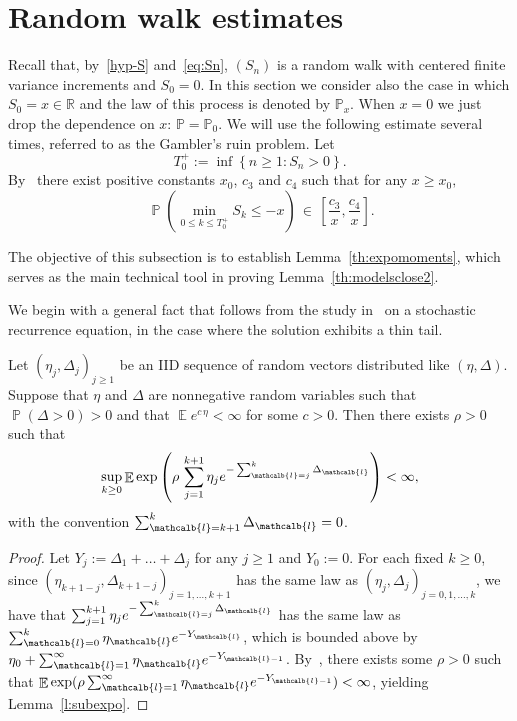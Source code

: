 \documentclass[AHL,Unicode,longabstracts,published]{cedram}
\newcommand{\bbP}{\mathbb{P}}
\newcommand{\bbR}{\mathbb{R}}
\newcommand{\gD}{\Delta}
\DeclareMathOperator{\p}{\mathbb{P}}
\DeclareMathOperator{\e}{\mathbb{E}}
\renewcommand{\ell}{\mathcalb{l}}
\begin{document}
\section{Random walk estimates}
\label{sec:A}
Recall that, by~\eqref{hyp-S} and~\eqref{eq:Sn}, $(S_n)$ is a random walk with centered finite variance increments and $S_0=0$. In this section we consider also the case in which $S_0=x\in \bbR$ and the law of this process is denoted by $\bbP_x$. When $x=0$ we just drop the dependence on $x$: $\bbP=\bbP_0$. We will use the following estimate several times, referred to as the Gambler's ruin problem. Let
\begin{equation}
T^+_0:= \inf\left\{n\ge 1: S_n >0\right\}.
\end{equation}
By~\cite[Theorem~5.1.7]{cf:LaLi} there exist positive constants $x_0$, $c_3$ and $c_4$ such that for any $x\ge x_0, $
\begin{equation}
\,\p\left(\min_{0\le k\le T^+_0}S_k \le -x \right) \,\in\, \left[\frac{c_3}x, \frac{c_4}x\right].\label{exitproba1}
\end{equation}


The objective of this subsection is to establish Lemma~\ref{th:expomoments}, which serves as the main technical tool in proving Lemma~\ref{th:modelsclose2}.



We begin with a general fact that follows from the study in~\cite{Goldie-Grubel} on a stochastic recurrence equation, in the case where the solution exhibits a thin tail.

\begin{lemm}\label{l:subexpo}
Let $(\eta_j, \Delta_j)_{j\ge 1}$ be an IID sequence of random vectors distributed like $(\eta, \Delta)$. Suppose that $\eta$ and $\Delta$ are nonnegative random variables such that $\p(\Delta>0)>0$ and that $\e e^{c \, \eta }< \infty$ for some $c>0$. Then there exists $\rho>0$ such that
\begin{equation}
\sup_{k\ge 0} \e \exp\left(\rho \, \sum_{j=1}^{k+1} \eta_j e^{- \sum_{\ell=j}^{k} \Delta_\ell} \right)<\infty,
\end{equation}
with the convention $ \sum_{\ell=k+1}^{k} \Delta_\ell=0$.
\end{lemm}

\begin{proof}
Let $Y_j:= \Delta_1+\dots+\Delta_j$ for any $j\ge 1$ and $Y_0:=0$. For each fixed $k\ge 0$, since $(\eta_{k+1-j}, \gD_{k+1-j})_{j=1, \dots, k+1}$ has the same law as $(\eta_j, \gD_j)_{j=0,1, \dots, k}$, we have that $\sum_{j=1}^{k+1} \eta_j e^{- \sum_{\ell=j}^{k} \Delta_\ell}$ has the same law as $\sum_{\ell=0}^k \eta_\ell e^{-Y_\ell} $, which is bounded above by $\eta_0+\sum_{\ell=1}^\infty \eta_\ell e^{-Y_{\ell-1} } $. By~\cite[Theorem~2.1]{Goldie-Grubel}, there exists some $\rho>0$ such that $\e \exp(\rho \sum_{\ell=1}^\infty \eta_\ell e^{-Y_{\ell-1} }) < \infty$, yielding Lemma~\ref{l:subexpo}.
\end{proof}
\end{document}
